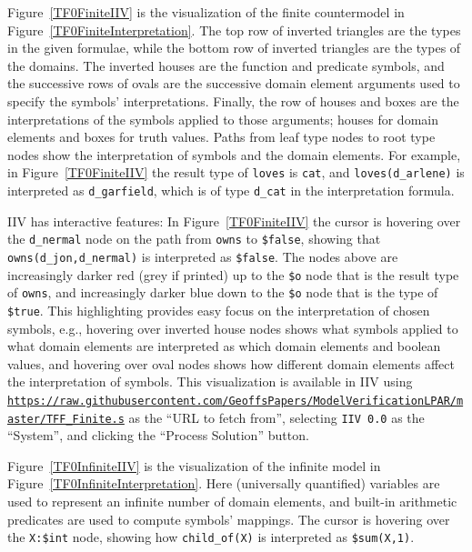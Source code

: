 \documentclass{easychair}
\newcommand{\smalltt}[1]{\small \texttt{#1}}
\begin{document}
Figure~\ref{TF0FiniteIIV} is the visualization of the finite countermodel in 
Figure~\ref{TF0FiniteInterpretation}.
The top row of inverted triangles are the types in the given formulae,
while the bottom row of inverted triangles are the types of the domains.
The inverted houses are the function and predicate symbols, and the successive rows of ovals are 
the successive domain element arguments used to specify the symbols' interpretations.
Finally, the row of houses and boxes are the interpretations of the symbols applied to those
arguments; houses for domain elements and boxes for truth values.
Paths from leaf type nodes to root type nodes show the interpretation of symbols and the domain
elements.
For example, in Figure~\ref{TF0FiniteIIV} the result type of {\smalltt{loves}} is {\smalltt{cat}},
and {\smalltt{loves(d\_arlene)}} is interpreted as {\smalltt{d\_garfield}}, which is of type
{\smalltt{d\_cat}} in the interpretation formula.

IIV has interactive features: In Figure~\ref{TF0FiniteIIV} the cursor is hovering over the 
{\smalltt{d\_nermal}} node on the path from {\smalltt{owns}} to {\smalltt{\$false}}, showing 
that {\smalltt{owns(d\_jon,d\_nermal)}} is interpreted as {\smalltt{\$false}}.
The nodes above are increasingly darker red (grey if printed) up to the {\smalltt{\$o}} node
that is the result type of {\smalltt{owns}}, and increasingly darker blue down to 
the {\smalltt{\$o}} node that is the type of {\smalltt{\$true}}.
This highlighting provides easy focus on the interpretation of chosen symbols, e.g., hovering
over inverted house nodes shows what symbols applied to what domain elements are interpreted as 
which domain elements and boolean values, and hovering over oval nodes shows how different domain 
elements affect the interpretation of symbols.
This visualization is available in IIV using 
{\smalltt{\url{https://raw.githubusercontent.com/GeoffsPapers/ModelVerificationLPAR/master/TFF_Finite.s}}}
as the ``URL to fetch from'',
selecting {\tt IIV 0.0} as the ``System'', and clicking the ``Process Solution'' button.

Figure~\ref{TF0InfiniteIIV} is the visualization of the infinite model in 
Figure~\ref{TF0InfiniteInterpretation}. 
Here (universally quantified) variables are used to represent an infinite number of
domain elements, and built-in arithmetic predicates are used to compute symbols' mappings.
The cursor is hovering over the {\smalltt{X:\$int}} node, showing how 
{\smalltt{child\_of(X)}} is interpreted as {\smalltt{\$sum(X,1)}}.
\end{document}

